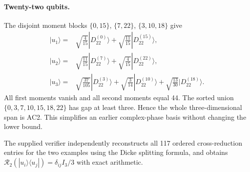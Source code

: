 \documentclass[11pt]{article}
\begin{document}
\paragraph{Twenty-two qubits.}
The disjoint moment blocks
$\{0,15\}$, $\{7,22\}$, $\{3,10,18\}$ give
\begin{align*}
 |u_1\rangle={}&\sqrt{\frac4{15}}|D_{22}^{(0)}\rangle
              +\sqrt{\frac{11}{15}}|D_{22}^{(15)}\rangle,\\
 |u_2\rangle={}&\sqrt{\frac{11}{15}}|D_{22}^{(7)}\rangle
              +\sqrt{\frac4{15}}|D_{22}^{(22)}\rangle,\\
 |u_3\rangle={}&\sqrt{\frac{37}{105}}|D_{22}^{(3)}\rangle
              +\sqrt{\frac3{14}}|D_{22}^{(10)}\rangle
              +\sqrt{\frac{13}{30}}|D_{22}^{(18)}\rangle.
\end{align*}
All first moments vanish and all second moments equal 44. The sorted
union $\{0,3,7,10,15,18,22\}$ has gap at least three. Hence the whole
three-dimensional span is AC2. This simplifies an earlier complex-phase
basis without changing the lower bound.

The supplied verifier independently reconstructs all 117 ordered
cross-reduction entries for the two examples using the Dicke splitting
formula, and obtains $\mathcal R_2(|u_i\rangle\langle u_j|)=\delta_{ij}I_3/3$
with exact arithmetic.
\end{document}
